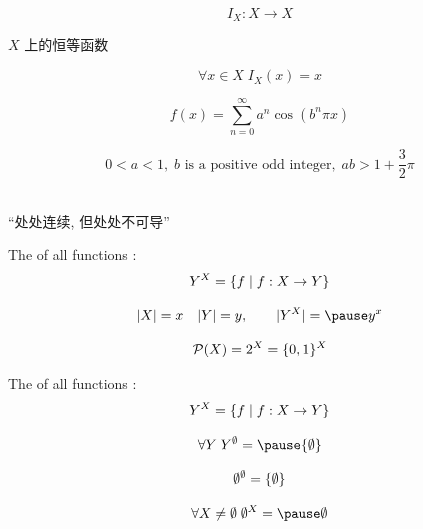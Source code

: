 \begin{frame}{}
  \[
    I_{X} : X \to X
  \]

  \vspace{0.20cm}
  \begin{center}
    $X$ 上的恒等函数
  \end{center}

  \[
    \forall x \in X\; I_{X}(x) = x
  \]
\end{frame}

\begin{frame}{}
  \[
    f(x)=\sum_{n=0} ^\infty a^n \cos(b^n \pi x)
  \]

  \[
    0 < a < 1,\; b \text{ is a positive odd integer},\; ab > 1+\frac{3}{2} \pi
  \]


  \pause
  \begin{center}
     \\[3pt]
    ``处处连续, 但处处不可导''
  \end{center}
\end{frame}

\begin{frame}
  \begin{definition}[$Y^{X}$]
    The  of all functions :
    \[
      Y^{X} = \{f \mid f: X \to Y\}
    \]
  \end{definition}

  \pause
  \vspace{0.50cm}
  \[
    |X| = x \quad |Y| = y, \qquad |Y^{X}| = \pause y^{x}
  \]

  \pause
  \vspace{0.30cm}
  \[
    \mathcal{P}(X) = 2^{X} = \{0, 1\}^{X}
  \]
\end{frame}

\begin{frame}{}
  \begin{definition}[$Y^{X}$]
    The  of all functions :
    \[
      Y^{X} = \{f \mid f: X \to Y\}
    \]
  \end{definition}

  \[
    \forall Y\; Y^{\emptyset} = \pause \set{\emptyset}
  \]

  \pause
  \vspace{-0.30cm}
  \[
    \emptyset^{\emptyset} = \{\emptyset\}
  \]

  \pause
  \[
    \forall X \neq \emptyset\; \emptyset^{X} = \pause \emptyset
  \]
\end{frame}

